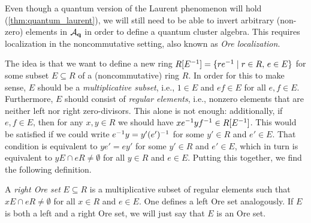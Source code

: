 Even though a quantum version of the Laurent phenomenon will hold
(\cref{thm:quantum_laurent}), we will still need to be able to invert arbitrary
(non-zero) elements in $\mathcal{A}_{\mathbf{q}}$ in order to define a quantum cluster algebra. This
requires localization in the noncommutative setting, also known as \emph{Ore
	localization}.

The idea is that we want to define a new ring $R[E^{-1}] = \{re^{-1} \mid r \in R,\,e \in
	E\}$ for some subset $E \subseteq R$ of a (noncommutative) ring $R$. In order for this
to make sense, $E$ should be a \emph{multiplicative subset}, i.e., $1 \in E$ and $ef \in E$ for all $e,f \in E$. Furthermore, $E$ should
consist of \emph{regular elements}, i.e., nonzero elements that
are neither left nor right zero-divisors. This alone is not enough: additionally, if
$e, f \in E$, then for any $x, y \in R$ we should have $xe^{-1} yf^{-1} \in R[E^{-1}]$.
This would be satisfied if we could write $e^{-1} y = y' (e')^{-1}$ for some $y' \in R$
and $e' \in E$. That condition is equivalent to $y e' = e y'$ for some $y' \in R$ and
$e' \in E$, which in turn is equivalent to $y E \cap e R \neq \emptyset$ for all $y \in
	R$ and $e \in E$. Putting this together, we find the following definition.
\begin{definition}
	A \emph{right Ore set} $E
		\subseteq R$ is a multiplicative subset of regular elements such that $x E \cap e R
		\neq \emptyset$ for all $x \in R$ and $e \in E$. One defines a left Ore set
	analogously. If $E$ is both a left and a right Ore set, we will just say that $E$ is an Ore set.
\end{definition}

